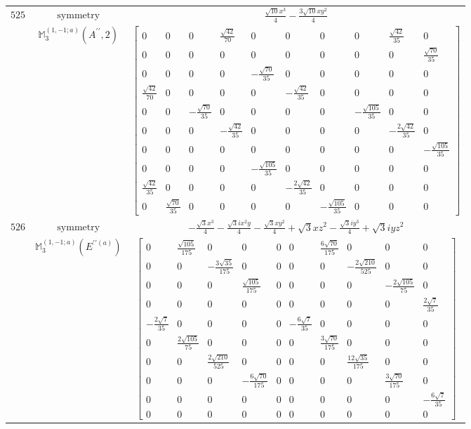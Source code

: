 \documentclass[fleqn,8pt,landscape]{jsarticle}
\begin{document}
\begin{longtable}{ccc}
$ 525 $ & $ \text{symmetry} $ & $ \frac{\sqrt{10} x^{3}}{4} - \frac{3 \sqrt{10} x y^{2}}{4} $ \\
$  $ & $ \mathbb{M}_{3}^{(1,-1;a)}(A^{\prime\prime},2) $ & $ \begin{bmatrix} 0 & 0 & 0 & \frac{\sqrt{42}}{70} & 0 & 0 & 0 & 0 & \frac{\sqrt{42}}{35} & 0 \\ 0 & 0 & 0 & 0 & 0 & 0 & 0 & 0 & 0 & \frac{\sqrt{70}}{35} \\ 0 & 0 & 0 & 0 & - \frac{\sqrt{70}}{35} & 0 & 0 & 0 & 0 & 0 \\ \frac{\sqrt{42}}{70} & 0 & 0 & 0 & 0 & - \frac{\sqrt{42}}{35} & 0 & 0 & 0 & 0 \\ 0 & 0 & - \frac{\sqrt{70}}{35} & 0 & 0 & 0 & 0 & - \frac{\sqrt{105}}{35} & 0 & 0 \\ 0 & 0 & 0 & - \frac{\sqrt{42}}{35} & 0 & 0 & 0 & 0 & - \frac{2 \sqrt{42}}{35} & 0 \\ 0 & 0 & 0 & 0 & 0 & 0 & 0 & 0 & 0 & - \frac{\sqrt{105}}{35} \\ 0 & 0 & 0 & 0 & - \frac{\sqrt{105}}{35} & 0 & 0 & 0 & 0 & 0 \\ \frac{\sqrt{42}}{35} & 0 & 0 & 0 & 0 & - \frac{2 \sqrt{42}}{35} & 0 & 0 & 0 & 0 \\ 0 & \frac{\sqrt{70}}{35} & 0 & 0 & 0 & 0 & - \frac{\sqrt{105}}{35} & 0 & 0 & 0 \end{bmatrix} $ \\ \hline
$ 526 $ & $ \text{symmetry} $ & $ - \frac{\sqrt{3} x^{3}}{4} - \frac{\sqrt{3} i x^{2} y}{4} - \frac{\sqrt{3} x y^{2}}{4} + \sqrt{3} x z^{2} - \frac{\sqrt{3} i y^{3}}{4} + \sqrt{3} i y z^{2} $ \\
$  $ & $ \mathbb{M}_{3}^{(1,-1;a)}(E^{\prime\prime(a)}) $ & $ \begin{bmatrix} 0 & \frac{\sqrt{105}}{175} & 0 & 0 & 0 & 0 & \frac{6 \sqrt{70}}{175} & 0 & 0 & 0 \\ 0 & 0 & - \frac{3 \sqrt{35}}{175} & 0 & 0 & 0 & 0 & - \frac{2 \sqrt{210}}{525} & 0 & 0 \\ 0 & 0 & 0 & \frac{\sqrt{105}}{175} & 0 & 0 & 0 & 0 & - \frac{2 \sqrt{105}}{75} & 0 \\ 0 & 0 & 0 & 0 & 0 & 0 & 0 & 0 & 0 & \frac{2 \sqrt{7}}{35} \\ - \frac{2 \sqrt{7}}{35} & 0 & 0 & 0 & 0 & - \frac{6 \sqrt{7}}{35} & 0 & 0 & 0 & 0 \\ 0 & \frac{2 \sqrt{105}}{75} & 0 & 0 & 0 & 0 & \frac{3 \sqrt{70}}{175} & 0 & 0 & 0 \\ 0 & 0 & \frac{2 \sqrt{210}}{525} & 0 & 0 & 0 & 0 & \frac{12 \sqrt{35}}{175} & 0 & 0 \\ 0 & 0 & 0 & - \frac{6 \sqrt{70}}{175} & 0 & 0 & 0 & 0 & \frac{3 \sqrt{70}}{175} & 0 \\ 0 & 0 & 0 & 0 & 0 & 0 & 0 & 0 & 0 & - \frac{6 \sqrt{7}}{35} \\ 0 & 0 & 0 & 0 & 0 & 0 & 0 & 0 & 0 & 0 \end{bmatrix} $ \\ \hline

\end{longtable}
\end{document}
